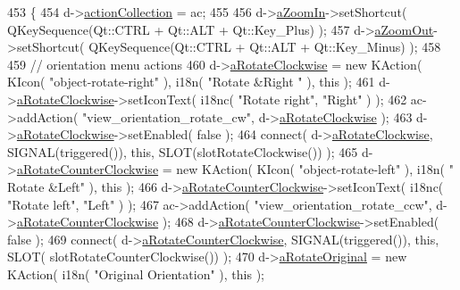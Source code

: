 \begin{DoxyCode}
453 \{
454     d->\hyperlink{classPageViewPrivate_a6abf868c8b0713a89291d48eef79d193}{actionCollection} = ac;
455 
456     d->\hyperlink{classPageViewPrivate_a07171f9e585da785aba41e84bf6014fb}{aZoomIn}->setShortcut( QKeySequence(Qt::CTRL + Qt::ALT + Qt::Key\_Plus) );
457     d->\hyperlink{classPageViewPrivate_a193ef99e27c1d7c1b1741e33ada152ec}{aZoomOut}->setShortcut( QKeySequence(Qt::CTRL + Qt::ALT + Qt::Key\_Minus) );
458 
459     \textcolor{comment}{// orientation menu actions}
460     d->\hyperlink{classPageViewPrivate_a389103a18e7590c8ec75c26e23806e51}{aRotateClockwise} = \textcolor{keyword}{new} KAction( KIcon( \textcolor{stringliteral}{"object-rotate-right"} ), i18n( \textcolor{stringliteral}{"Rotate &Right
      "} ), \textcolor{keyword}{this} );
461     d->\hyperlink{classPageViewPrivate_a389103a18e7590c8ec75c26e23806e51}{aRotateClockwise}->setIconText( i18nc( \textcolor{stringliteral}{"Rotate right"}, \textcolor{stringliteral}{"Right"} ) );
462     ac->addAction( \textcolor{stringliteral}{"view\_orientation\_rotate\_cw"}, d->\hyperlink{classPageViewPrivate_a389103a18e7590c8ec75c26e23806e51}{aRotateClockwise} );
463     d->\hyperlink{classPageViewPrivate_a389103a18e7590c8ec75c26e23806e51}{aRotateClockwise}->setEnabled( \textcolor{keyword}{false} );
464     connect( d->\hyperlink{classPageViewPrivate_a389103a18e7590c8ec75c26e23806e51}{aRotateClockwise}, SIGNAL(triggered()), \textcolor{keyword}{this}, SLOT(slotRotateClockwise()) );
465     d->\hyperlink{classPageViewPrivate_a4a8b7b626080698fa1dbf78d60cbff59}{aRotateCounterClockwise} = \textcolor{keyword}{new} KAction( KIcon( \textcolor{stringliteral}{"object-rotate-left"} ), i18n( \textcolor{stringliteral}{"
      Rotate &Left"} ), \textcolor{keyword}{this} );
466     d->\hyperlink{classPageViewPrivate_a4a8b7b626080698fa1dbf78d60cbff59}{aRotateCounterClockwise}->setIconText( i18nc( \textcolor{stringliteral}{"Rotate left"}, \textcolor{stringliteral}{"Left"} ) );
467     ac->addAction( \textcolor{stringliteral}{"view\_orientation\_rotate\_ccw"}, d->\hyperlink{classPageViewPrivate_a4a8b7b626080698fa1dbf78d60cbff59}{aRotateCounterClockwise} );
468     d->\hyperlink{classPageViewPrivate_a4a8b7b626080698fa1dbf78d60cbff59}{aRotateCounterClockwise}->setEnabled( \textcolor{keyword}{false} );
469     connect( d->\hyperlink{classPageViewPrivate_a4a8b7b626080698fa1dbf78d60cbff59}{aRotateCounterClockwise}, SIGNAL(triggered()), \textcolor{keyword}{this}, SLOT(
      slotRotateCounterClockwise()) );
470     d->\hyperlink{classPageViewPrivate_ae57bd1f37889d8a28535e877c2fa87ed}{aRotateOriginal} = \textcolor{keyword}{new} KAction( i18n( \textcolor{stringliteral}{"Original Orientation"} ), \textcolor{keyword}{this} );

\end{DoxyCode}
